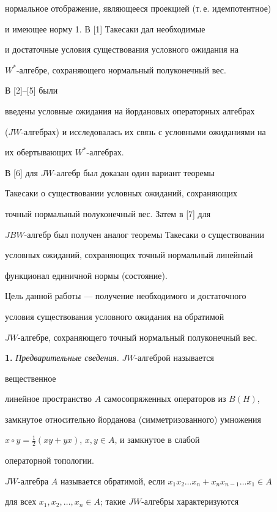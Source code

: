 нормальное отображение, являющееся проекцией (т.\,е. идемпотентное) 


и имеющее норму 1. В [1] Такесаки дал необходимые 


и достаточные условия существования условного ожидания на 


$W^*$-алгебре, сохраняющего нормальный полуконечный вес. 


В [2]--[5] были 


введены условные ожидания на йордановых операторных алгебрах 


($JW$-алгебрах) и исследовалась их связь с условными ожиданиями на 


их обертывающих $W^*$-алгебрах. 


В [6] для $JW$-алгебр был доказан один вариант теоремы 


Такесаки о существовании условных ожиданий, сохраняющих


точный нормальный полуконечный вес. Затем в [7] для 


$JBW$-алгебр был получен аналог теоремы Такесаки о существовании 


условных ожиданий, сохраняющих точный нормальный линейный 


функционал единичной нормы (состояние). 


 


Цель данной работы --- получение необходимого и достаточного 


условия существования условного ожидания на обратимой 


$JW$-алгебре, сохраняющего точный нормальный полуконечный вес. 


\medskip 


 


{\bf 1.} {\it Предварительные сведения.} $JW$-алгеброй называется 


вещественное 


линейное пространство $A$ самосопряженных операторов из $B(H)$, 


замкнутое относительно йорданова (симметризованного) умножения 


$x\circ y=\frac{1}{2}(xy+yx)$, $x,y\in A$, и замкнутое в слабой 


операторной топологии.\; 


$JW$-алгебра $A$ называется обратимой, если $x_1x_2\dotsc x_n+x_n 


x_{n-1}\dotsc x_1{\in} A$ 


для всех $x_1,x_2,\dotsc,x_n{\in} A$; такие $JW$-алгебры характеризуются 


